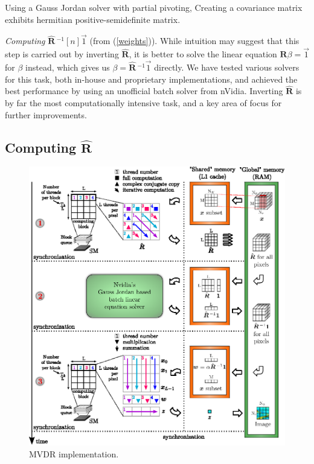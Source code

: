 \documentclass[12pt,journal,captionsoff,onecolumn]{IEEEtran}
\let\MYoriglatexcaption\caption               %
\renewcommand{\caption}[2][\relax]{\MYoriglatexcaption[#2]{#2}}
\newcommand\mat[1]{\boldsymbol{#1}}
\newcommand\1{\vec 1}
\newcommand*\R{\mat R}
\newcommand*\eR{\mat{\hat R}}
\newcommand*\eRi{\hat{\mat R}\,\!^{-1}}
\begin{document}
Using a Gauss Jordan solver with partial pivoting,
Creating a covariance matrix exhibits hermitian positive-semidefinite matrix.

\emph{Computing} $\eRi[n]\1$ (from (\ref{weights})). While intuition may suggest that this step is carried out by inverting $\eR$, it is better to solve the linear equation $\R\beta = \1$ for $\beta$ instead, which gives us $\beta = \eRi\1$ directly. We have tested various solvers for this task, both in-house and proprietary implementations, and achieved the best performance by using an unofficial batch solver from nVidia. Inverting $\eR$ is by far the most computationally intensive task, and a key area of focus for further improvements.




\subsection{Computing $\hat{\boldsymbol{R}}$}

\begin{figure}[!t]
\centering
\includegraphics[width=\linewidth]{gfx/mvdr_implementation.eps}
\caption{MVDR implementation.}\label{mvdr_implementation}
\end{figure}
\end{document}

